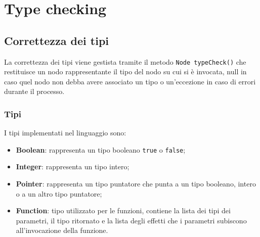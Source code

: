 \documentclass[../report.tex]{subfiles}
\begin{document}
\chapter{Type checking}\label{c:typechecking}
\section{Correttezza dei tipi}
La correttezza dei tipi viene gestista tramite il metodo \verb|Node typeCheck()| che restituisce un nodo rappresentante il tipo del nodo su cui si \`e invocata, null in caso quel nodo non debba avere associato un tipo o  un'eccezione in caso di errori durante il processo.
\subsection{Tipi}
I tipi implementati nel linguaggio sono:
\begin{itemize}
    \item \textbf{Boolean}: rappresenta un tipo booleano \verb|true| o \verb|false|;
    \item \textbf{Integer}: rappresenta un tipo intero;
    \item \textbf{Pointer}: rappresenta un tipo puntatore che punta a un tipo booleano, intero o a un altro tipo puntatore;
    \item \textbf{Function}: tipo utilizzato per le funzioni, contiene la lista dei tipi dei parametri, il tipo ritornato e la lista degli effetti che i parametri subiscono all'invocazione della funzione.
\end{itemize}
\end{document}
